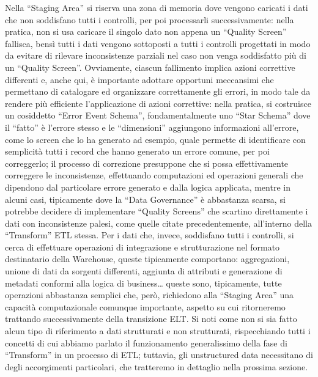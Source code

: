 \documentclass[a4paper,12pt]{report}
\begin{document}
\noindent
Nella “Staging Area” si riserva una zona di memoria dove vengono caricati i dati che non soddisfano tutti i controlli, per poi processarli successivamente: nella pratica, non si usa caricare il singolo dato non appena un “Quality Screen” fallisca, bensì tutti i dati vengono sottoposti a tutti i controlli progettati in modo da evitare di rilevare inconsistenze parziali nel caso non venga soddisfatto più di un “Quality Screen”. Ovviamente, ciascun fallimento implica azioni correttive differenti e, anche qui, è importante adottare opportuni meccansimi che permettano di catalogare ed organizzare correttamente gli errori, in modo tale da rendere più efficiente l’applicazione di azioni correttive: nella pratica, si costruisce un cosiddetto “Error Event Schema”, fondamentalmente uno “Star Schema” dove il “fatto” è l’errore stesso e le “dimensioni” aggiungono informazioni all’errore, come lo screen che lo ha generato ad esempio, quale permette di identificare con semplicità tutti i record che hanno generato un errore comune, per poi correggerlo; il processo di correzione presuppone che si possa effettivamente correggere le inconsistenze, effettuando computazioni ed operazioni generali che dipendono dal particolare errore generato e dalla logica applicata, mentre in alcuni casi, tipicamente dove la “Data Governance” è abbastanza scarsa, si potrebbe decidere di implementare “Quality Screens” che scartino direttamente i dati con inconsistenze palesi, come quelle citate precedentemente, all’interno della “Transform” ETL stessa. Per i dati che, invece, soddisfano tutti i controlli, si cerca di effettuare operazioni di integrazione e strutturazione nel formato destinatario della Warehouse, queste tipicamente comportano: aggregazioni, unione di dati da sorgenti differenti, aggiunta di attributi e generazione di metadati conformi alla logica di business… queste sono, tipicamente, tutte operazioni abbastanza semplici che, però, richiedono alla “Staging Area” una capacità computazionale comunque importante, aspetto su cui ritorneremo trattando successivamente della transizione ELT. Si noti come non si sia fatto alcun tipo di riferimento a dati strutturati e non strutturati, rispecchiando tutti i concetti di cui abbiamo parlato il funzionamento generalissimo della fase di “Transform” in un processo di ETL; tuttavia, gli unstructured data necessitano di degli accorgimenti particolari, che tratteremo in dettaglio nella prossima sezione.
\end{document}
